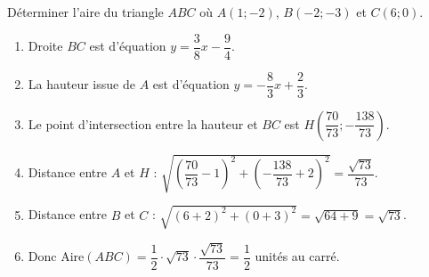 \documentclass{beamer}
\begin{document}
\begin{frame}{}
Déterminer l'aire du triangle $ABC$ où $A(1;-2)$, $B(-2;-3)$ et $C(6;0)$.
\end{frame}

\begin{frame}
	\begin{enumerate}
		\item Droite $BC$ est d'équation $y=\dfrac{3}{8}x-\dfrac{9}{4}$.
		\item La hauteur issue de $A$ est d'équation $y=-\dfrac{8}{3}x+\dfrac{2}{3}$.
		\item Le point d'intersection entre la hauteur et $BC$ est $H\left(\dfrac{70}{73};-\dfrac{138}{73}\right)$.
		\item Distance entre $A$ et $H$ : $\sqrt{\left(\dfrac{70}{73}-1\right)^2+\left(-\dfrac{138}{73}+2\right)^2}=\dfrac{\sqrt{73}}{73}$.
		\item Distance entre $B$ et $C$ : $\sqrt{(6+2)^2+(0+3)^2}=\sqrt{64+9}=\sqrt{73}$.
		\item  Donc $\text{Aire}(ABC)=\dfrac{1}{2}\cdot\sqrt{73}\cdot\dfrac{\sqrt{73}}{73}=\dfrac{1}{2}$ unités au carré.
	\end{enumerate}
\end{frame}
\end{document}
